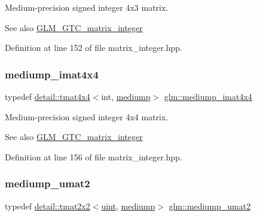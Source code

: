 Medium-\/precision signed integer 4x3 matrix. \begin{DoxySeeAlso}{See also}
\hyperlink{group__gtc__matrix__integer}{G\+L\+M\+\_\+\+G\+T\+C\+\_\+matrix\+\_\+integer} 
\end{DoxySeeAlso}


Definition at line 152 of file matrix\+\_\+integer.\+hpp.

\mbox{\label{group__gtc__matrix__integer_gafa2df6be3aad055867b9bfea34e9c4a0}} 
\subsubsection{\texorpdfstring{mediump\+\_\+imat4x4}{mediump\_imat4x4}}
{\footnotesize\ttfamily typedef \hyperlink{structglm_1_1detail_1_1tmat4x4}{detail\+::tmat4x4}$<$int, \hyperlink{namespaceglm_a0f04f086094c747d227af4425893f545a6416f3ea0c9025fb21ed50c4d6620482}{mediump}$>$ \hyperlink{group__gtc__matrix__integer_gafa2df6be3aad055867b9bfea34e9c4a0}{glm\+::mediump\+\_\+imat4x4}}

Medium-\/precision signed integer 4x4 matrix. \begin{DoxySeeAlso}{See also}
\hyperlink{group__gtc__matrix__integer}{G\+L\+M\+\_\+\+G\+T\+C\+\_\+matrix\+\_\+integer} 
\end{DoxySeeAlso}


Definition at line 156 of file matrix\+\_\+integer.\+hpp.

\mbox{\label{group__gtc__matrix__integer_ga388a5b9d7e494d5f5bd30b9e11ded06a}} 
\subsubsection{\texorpdfstring{mediump\+\_\+umat2}{mediump\_umat2}}
{\footnotesize\ttfamily typedef \hyperlink{structglm_1_1detail_1_1tmat2x2}{detail\+::tmat2x2}$<$\hyperlink{group__core__precision_ga4fd29415871152bfb5abd588334147c8}{uint}, \hyperlink{namespaceglm_a0f04f086094c747d227af4425893f545a6416f3ea0c9025fb21ed50c4d6620482}{mediump}$>$ \hyperlink{group__gtc__matrix__integer_ga388a5b9d7e494d5f5bd30b9e11ded06a}{glm\+::mediump\+\_\+umat2}}

